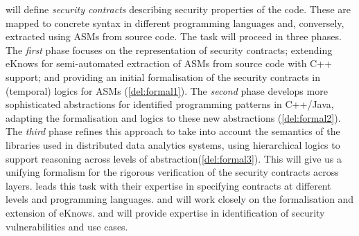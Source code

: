\begin{Workpackage}{\thewpno}
\begin{Task}
\theTask{} will define \emph{security contracts} describing security properties of the code. These are mapped to concrete syntax in different
programming languages and, conversely, extracted using ASMs from source code. The task will proceed in three phases.
The \emph{first} phase focuses on the representation of security contracts;  extending \textsf{eKnows} for semi-automated extraction of ASMs from source code with C++ support; and providing an initial formalisation of the security contracts in (temporal) logics for ASMs (\ref{del:formal1}). The \emph{second} phase develops more sophisticated abstractions for identified programming patterns in C++/Java, adapting the formalisation and logics to these new abstractions (\ref{del:formal2}). The \emph{third} phase refines this approach to take into account the semantics of the libraries used in distributed data analytics systems, using hierarchical logics to support reasoning across levels of abstraction(\ref{del:formal3}). This will give us a unifying formalism for the rigorous verification of the security contracts across layers.
\UCM leads this task with their expertise in specifying contracts at different levels and programming languages. \SA and \SCCHshort will work closely on the formalisation and extension of \textsf{eKnows}. \IBMshort and \SOPRAshort will provide expertise in identification of security vulnerabilities and use cases.
\end{Task}

\begin{Task}
\TaskResults{%
\ref{del:formal1},
\ref{del:formal2},
\ref{del:formal3}
}
\TaskHeader{}


\end{Task}
\end{Workpackage}
